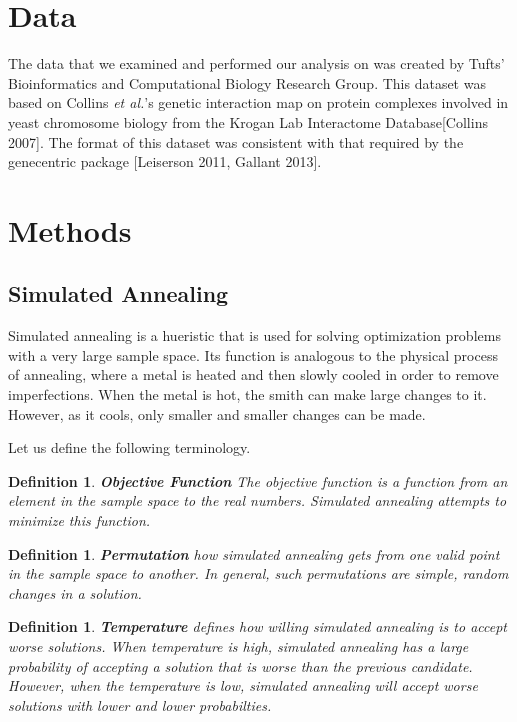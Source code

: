 \documentclass[11pt]{article}
\newtheorem{definition}[theorem]{Definition}
\begin{document}
\section{Data}

The data that we examined and performed our analysis on was created by Tufts' Bioinformatics and Computational Biology Research Group. This dataset was based on Collins \textit{et al.}'s genetic interaction map on protein complexes involved in yeast chromosome biology from the Krogan Lab Interactome Database[Collins 2007]. The format of this dataset was consistent with that required by the genecentric package [Leiserson 2011, Gallant 2013]. 
\section{Methods}
\subsection{Simulated Annealing}
\par Simulated annealing is a hueristic that is used for solving optimization problems with a very large sample space. Its function is analogous to the physical process of annealing, where a metal is heated and then slowly cooled in order to remove imperfections. When the metal is hot, the smith can make large changes to it. However, as it cools, only smaller and smaller changes can be made. 

\par Let us define the following terminology. 

\begin{definition}
{\bf Objective Function} The objective function is a function from an element in the sample space to the real numbers. Simulated annealing attempts to minimize this function.
\end{definition}
 
\begin{definition}
{\bf Permutation} how simulated annealing gets from one valid point in the sample space to another. In general, such permutations are simple, random changes in a solution. 
\end{definition}


\begin{definition}
{\bf Temperature}  defines how willing simulated annealing is to accept worse solutions. When temperature is high, simulated annealing has a large probability of accepting a solution that is worse than the previous candidate. However, when the temperature is low, simulated annealing will accept worse solutions with lower and lower probabilties. 
\end{definition}
\end{document}
